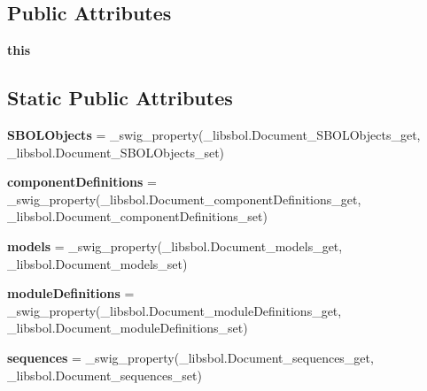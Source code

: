 \subsection*{Public Attributes}
\begin{DoxyCompactItemize}
\item 
{\bfseries this}\hypertarget{classsbol_1_1libsbol_1_1_document_a0fa6739ee4f21c6dee56f88538aee3b3}{}\label{classsbol_1_1libsbol_1_1_document_a0fa6739ee4f21c6dee56f88538aee3b3}

\end{DoxyCompactItemize}
\subsection*{Static Public Attributes}
\begin{DoxyCompactItemize}
\item 
{\bfseries S\+B\+O\+L\+Objects} = \+\_\+swig\+\_\+property(\+\_\+libsbol.\+Document\+\_\+\+S\+B\+O\+L\+Objects\+\_\+get, \+\_\+libsbol.\+Document\+\_\+\+S\+B\+O\+L\+Objects\+\_\+set)\hypertarget{classsbol_1_1libsbol_1_1_document_addf1cc5ab6ad90813be3ca2890d3f2c0}{}\label{classsbol_1_1libsbol_1_1_document_addf1cc5ab6ad90813be3ca2890d3f2c0}

\item 
{\bfseries component\+Definitions} = \+\_\+swig\+\_\+property(\+\_\+libsbol.\+Document\+\_\+component\+Definitions\+\_\+get, \+\_\+libsbol.\+Document\+\_\+component\+Definitions\+\_\+set)\hypertarget{classsbol_1_1libsbol_1_1_document_a6209e33914513ccd0c55d4252a0019c4}{}\label{classsbol_1_1libsbol_1_1_document_a6209e33914513ccd0c55d4252a0019c4}

\item 
{\bfseries models} = \+\_\+swig\+\_\+property(\+\_\+libsbol.\+Document\+\_\+models\+\_\+get, \+\_\+libsbol.\+Document\+\_\+models\+\_\+set)\hypertarget{classsbol_1_1libsbol_1_1_document_a856382a0fce02e2ccb04c33c452adc18}{}\label{classsbol_1_1libsbol_1_1_document_a856382a0fce02e2ccb04c33c452adc18}

\item 
{\bfseries module\+Definitions} = \+\_\+swig\+\_\+property(\+\_\+libsbol.\+Document\+\_\+module\+Definitions\+\_\+get, \+\_\+libsbol.\+Document\+\_\+module\+Definitions\+\_\+set)\hypertarget{classsbol_1_1libsbol_1_1_document_aacb86e5f43fb531778eb928d23c72150}{}\label{classsbol_1_1libsbol_1_1_document_aacb86e5f43fb531778eb928d23c72150}

\item 
{\bfseries sequences} = \+\_\+swig\+\_\+property(\+\_\+libsbol.\+Document\+\_\+sequences\+\_\+get, \+\_\+libsbol.\+Document\+\_\+sequences\+\_\+set)\hypertarget{classsbol_1_1libsbol_1_1_document_a6bfc69ce7fac31b5d0140a1eabd23fae}{}\label{classsbol_1_1libsbol_1_1_document_a6bfc69ce7fac31b5d0140a1eabd23fae}


\end{DoxyCompactItemize}
